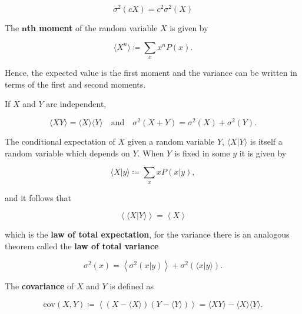 \begin{equation*}
  \sigma^2(cX) = c^2\sigma^2(X)
\end{equation*}

The $\mathbf{n}$\textbf{th moment} of the random variable $X$ is given by

\begin{equation*}
  \langle X^n\rangle \coloneqq \sum_xx^nP(x).
\end{equation*}

Hence, the expected value is the first moment and the variance can be written in terms of the first and second moments.

If $X$ and $Y$ are independent,

\begin{equation}
  \label {eq:con-mom_ind}
  \langle XY\rangle = \langle X\rangle\langle Y\rangle \quad\text{and}\quad \sigma^2(X+Y) = \sigma^2(X)+\sigma^2(Y).
\end{equation}

The conditional expectation of $X$ given a random variable $Y$, $\langle X|Y\rangle$ is itself a random variable which depends on $Y$. When $Y$ is fixed in some $y$ it is given by

\begin{equation*}
  \langle X|y\rangle \coloneqq \sum_xxP(x|y),
\end{equation*}

and it follows that

\begin{equation*}
  \left\langle\langle X|Y\rangle\right\rangle = \left\langle X\right\rangle
\end{equation*}

which is the \textbf{law of total expectation}, for the variance there is an analogous theorem called the \textbf{law of total variance}

\begin{equation*}
  \sigma^2(x) = \left\langle\sigma^2(x|y)\right\rangle + \sigma^2\left(\langle x|y\rangle\right).
\end{equation*}

The \textbf{covariance} of $X$ and $Y$ is defined as

\begin{equation*}
  \text{cov}(X,Y) \coloneqq \left\langle\left(X-\langle X\rangle\right)\left(Y-\langle Y\rangle\right)\right\rangle = \langle XY\rangle - \langle X\rangle\langle Y\rangle.
\end{equation*}

